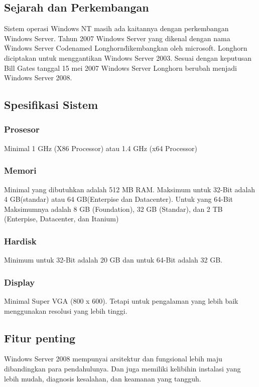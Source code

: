 	\subsection{Sejarah dan Perkembangan}
		Sistem operasi Windows NT masih ada kaitannya dengan perkembangan Windows Server. Tahun 2007 Windows Server yang dikenal dengan nama \" Windows Server Codenamed Longhorn\" dikembangkan oleh microsoft. Longhorn diciptakan untuk menggantikan Windows Server 2003. Sesuai dengan keputusan Bill Gates tanggal 15 mei 2007 Windows Server Longhorn berubah menjadi Windows Server 2008.
	\subsection{Spesifikasi Sistem}
		\subsubsection{Prosesor}
		Minimal 1 GHz (X86 Processor) atau 1.4 GHz (x64 Processor)
		\subsubsection{Memori}
		Minimal yang dibutuhkan adalah 512 MB RAM. Maksimum untuk 32-Bit adalah 4 GB(standar) atau 64 GB(Enterpise dan Datacenter). Untuk yang 64-Bit Maksimumnya adalah 8 GB (Foundation), 32 GB (Standar), dan 2 TB (Enterpise, Datacenter, dan Itanium)
		\subsubsection{Hardisk}
		Minimum untuk 32-Bit adalah 20 GB dan untuk 64-Bit adalah 32 GB.
		\subsubsection{Display}
		Minimal Super VGA (800 x 600). Tetapi untuk pengalaman yang lebih baik menggunakan resolusi yang lebih tinggi.
	\subsection{Fitur penting}
	Windows Server 2008 mempunyai arsitektur dan fungsional lebih maju dibandingkan para pendahulunya. Dan juga memiliki kelibihin instalasi yang lebih mudah, diagnosis kesalahan, dan keamanan yang tangguh.

